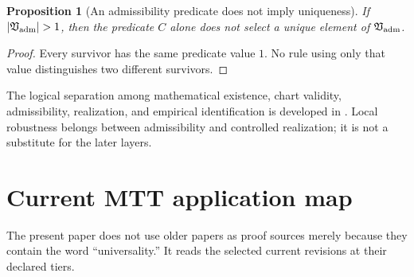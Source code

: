 \documentclass[11pt]{article}
\newtheorem{proposition}[theorem]{Proposition}
\theoremstyle{definition}
\theoremstyle{remark}
\newcommand{\1}{\mathbf 1}
\begin{document}
\begin{proposition}[An admissibility predicate does not imply uniqueness]
\label{prop:nonselection}
If \(|\mathfrak V_{\rm adm}|>1\), then the predicate \(C\) alone does not
select a unique element of \(\mathfrak V_{\rm adm}\).
\end{proposition}

\begin{proof}
Every survivor has the same predicate value \(1\).  No rule using only that
value distinguishes two different survivors.
\end{proof}

The logical separation among mathematical existence, chart validity,
admissibility, realization, and empirical identification is developed in
\cite{MTTVacuumSelection2026}.  Local robustness belongs between
admissibility and controlled realization; it is not a substitute for the
later layers.

\section{Current MTT application map}
\label{sec:applications}

The present paper does not use older papers as proof sources merely because
they contain the word ``universality.''  It reads the selected current
revisions at their declared tiers.
\end{document}
